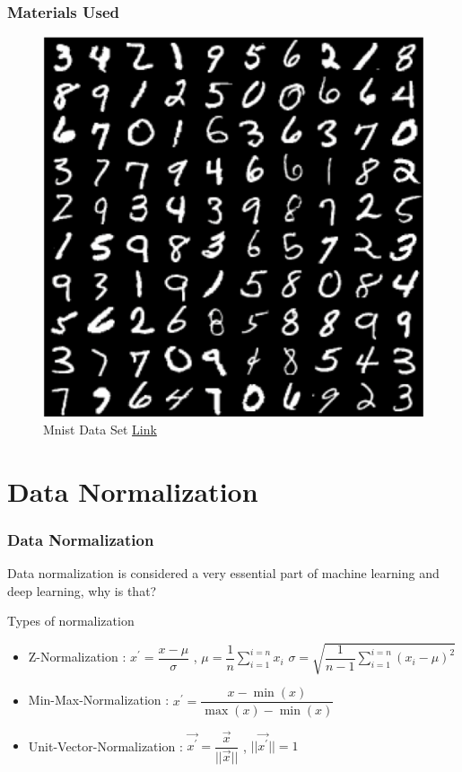 \documentclass{beamer}
\begin{document}
\begin{frame}
\frametitle{Materials Used}
\begin{figure}
\centering 
\includegraphics[scale=0.35]{mnist.png}
\caption{Mnist Data Set \textcolor{blue}{\href{https://medium.com/@ankitbatra2202/mnist-handwritten-digit-recognition-with-pytorch-cce6a33cd1c1}{Link}}}
\end{figure}
\end{frame}

\section{Data Normalization}

\begin{frame}
\frametitle{Data Normalization}
Data normalization is considered a very essential part of machine learning and deep learning, why is that?
\begin{block}{Types of normalization}
\begin{itemize}
\item \small Z-Normalization : $ x^{\prime} = \dfrac{x - \mu}{\sigma} $ , $ \mu = \dfrac{1}{n}\sum_{i=1}^{i=n}x_i $ $ \sigma = \sqrt{\dfrac{1}{n-1}\sum_{i=1}^{i=n}(x_i - \mu)^2} $
\item Min-Max-Normalization : $ x^{\prime} = \dfrac{x - \min{(x)}}{\max{(x)} - \min{(x)}} $
\item Unit-Vector-Normalization : $ \vec{x^{\prime}} = \dfrac{\vec{x}}{||\vec{x}||} $ , $ ||\vec{x^{\prime}}|| = 1 $
\end{itemize}
\end{block}
\end{frame}
\end{document}
